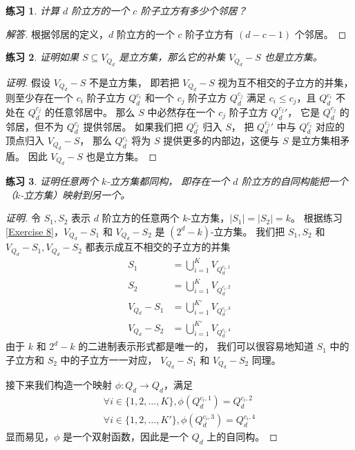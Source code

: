 \documentclass[12pt, a4paper]{article}
\newtheorem{exercisewithanswer}{练习}
\newenvironment{answer}[1][Answer]{
	\begin{proof}[#1]
	\let\qed\relax
}{
	\end{proof}
}
\begin{document}
\begin{exercisewithanswer}
计算 $d$ 阶立方的一个 $c$ 阶子立方有多少个邻居？
\end{exercisewithanswer}

\begin{answer}[解答]
根据邻居的定义，$d$ 阶立方的一个 $c$ 阶子立方有 $(d - c - 1)$ 个邻居。
\end{answer}

\begin{exercisewithanswer}
证明如果 $S \subseteq V_{Q_d}$ 是立方集，那么它的补集 $V_{Q_d} − S$ 也是立方集。
\end{exercisewithanswer}

\begin{proof}[证明]
假设 $V_{Q_d} − S$ 不是立方集，
即若把 $V_{Q_d} − S$ 视为互不相交的子立方的并集，
则至少存在一个 $c_i$ 阶子立方 $Q_d^{c_i}$ 和一个 $c_j$ 阶子立方 $Q_d^{c_j}$
满足 $c_i \le c_j$，且 $Q_d^{c_i}$ 不处在 $Q_d^{c_j}$ 的任意邻居中。
那么 $S$ 中必然存在一个 $c_j$ 阶子立方 ${Q_d^{c_j}}'$，
它是 $Q_d^{c_j}$ 的邻居，但不为 $Q_d^{c_i}$ 提供邻居。
如果我们把 $Q_d^{c_i}$ 归入 $S$，
把 ${Q_d^{c_j}}'$ 中与 $Q_d^{c_i}$ 对应的顶点归入 $V_{Q_d} − S$，
那么 $Q_d^{c_i}$ 将为 $S$ 提供更多的内部边，这便与 $S$ 是立方集相矛盾。
因此 $V_{Q_d} − S$ 也是立方集。
\end{proof}

\begin{exercisewithanswer}
证明任意两个 $k$-立方集都同构，
即存在一个 $d$ 阶立方的自同构能把一个（$k$-立方集）映射到另一个。
\end{exercisewithanswer}

\begin{proof}[证明]
令 $S_1, S_2$ 表示 $d$ 阶立方的任意两个 $k$-立方集，$|S_1| = |S_2| = k$。
根据练习 \ref{Exercise 8}，$V_{Q_d} - S_1$ 和 $V_{Q_d} - S_2$ 是 $(2^d - k)$-立方集。
我们把 $S_1, S_2$ 和 $V_{Q_d} - S_1, V_{Q_d} - S_2$ 都表示成互不相交的子立方的并集
\begin{align*}
S_1           & = \bigcup_{i = 1}^K V_{Q_d^{c_i, 1}} \\
S_2           & = \bigcup_{i = 1}^K V_{Q_d^{c_i, 2}} \\
V_{Q_d} - S_1 & = \bigcup_{i = 1}^{K'} V_{Q_d^{c_i, 3}} \\
V_{Q_d} - S_2 & = \bigcup_{i = 1}^{K'} V_{Q_d^{c_i, 4}}
\end{align*}
由于 $k$ 和 $2^d - k$ 的二进制表示形式都是唯一的，
我们可以很容易地知道 $S_1$ 中的子立方和 $S_2$ 中的子立方一一对应，
$V_{Q_d} - S_1$ 和 $V_{Q_d} - S_2$ 同理。

接下来我们构造一个映射 $\phi \colon Q_d \rightarrow Q_d$，满足
\begin{align*}
\forall i \in \{1, 2, \dots, K\}, \phi(Q_d^{c_i, 1}) = Q_d^{c_i, 2} \\
\forall i \in \{1, 2, \dots, K'\}, \phi(Q_d^{c_i, 3}) = Q_d^{c_i, 4}
\end{align*}
显而易见，$\phi$ 是一个双射函数，因此是一个 $Q_d$ 上的自同构。
\end{proof}
\end{document}
